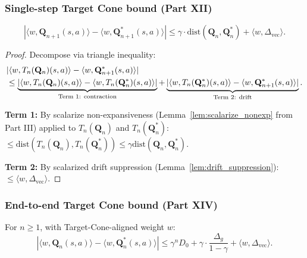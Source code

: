 \subsubsection{Single-step Target Cone bound (Part XII)}

\begin{theorem}
\label{thm:single_step_tc}
\begin{equation}
    |\langle w, \mathbf{Q}_{n+1}(s,a) \rangle - \langle w, \mathbf{Q}^*_{n+1}(s,a) \rangle| \le \gamma \cdot \mathrm{dist}(\mathbf{Q}_n, \mathbf{Q}^*_n) + \langle w, \Delta_{\mathrm{vec}} \rangle.
\end{equation}
\end{theorem}

\begin{proof}
Decompose via triangle inequality:
\begin{align}
    &|\langle w, T_n(\mathbf{Q}_n)(s,a) \rangle - \langle w, \mathbf{Q}^*_{n+1}(s,a) \rangle| \notag \\
    &\le \underbrace{|\langle w, T_n(\mathbf{Q}_n)(s,a) \rangle - \langle w, T_n(\mathbf{Q}^*_n)(s,a) \rangle|}_{\text{Term 1: contraction}} + \underbrace{|\langle w, T_n(\mathbf{Q}^*_n)(s,a) \rangle - \langle w, \mathbf{Q}^*_{n+1}(s,a) \rangle|}_{\text{Term 2: drift}}.
\end{align}

\textbf{Term 1:} By scalarize non-expansiveness (Lemma~\ref{lem:scalarize_nonexp} from Part III) applied to $T_n(\mathbf{Q}_n)$ and $T_n(\mathbf{Q}^*_n)$: $\le \mathrm{dist}(T_n(\mathbf{Q}_n), T_n(\mathbf{Q}^*_n)) \le \gamma \mathrm{dist}(\mathbf{Q}_n, \mathbf{Q}^*_n)$.

\textbf{Term 2:} By scalarized drift suppression (Lemma~\ref{lem:drift_suppression}): $\le \langle w, \Delta_{\mathrm{vec}} \rangle$.
\end{proof}

\subsubsection{End-to-end Target Cone bound (Part XIV)}

\begin{theorem}
\label{thm:target_cone}
For $n \ge 1$, with Target-Cone-aligned weight $w$:
\begin{equation}
    |\langle w, \mathbf{Q}_n(s,a) \rangle - \langle w, \mathbf{Q}^*_n(s,a) \rangle| \le \gamma^n D_0 + \gamma \cdot \frac{\Delta_g}{1{-}\gamma} + \langle w, \Delta_{\mathrm{vec}} \rangle.
    \label{eq:capstone}
\end{equation}
\end{theorem}


